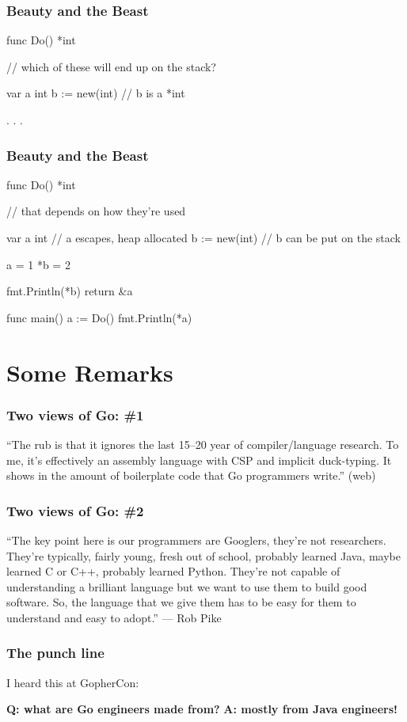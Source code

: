\documentclass[compress,t,11pt]{beamer}
\begin{document}
\begin{frame}[fragile]
    \frametitle{Beauty and the Beast}
\begin{golang}
func Do() *int {
    // which of these will end up on the stack?

    var a int
    b := new(int)   // b is a *int

    . . .
}
\end{golang}
\end{frame}

\begin{frame}[fragile]
    \frametitle{Beauty and the Beast}
\begin{golang}
func Do() *int {
    // that depends on how they're used

    var a int       // a escapes, heap allocated
    b := new(int)   // b can be put on the stack

    a = 1
    *b = 2

    fmt.Println(*b)
    return &a
}

func main() {
	a := Do()
	fmt.Println(*a)
}\end{golang}
\end{frame}

\section{Some Remarks}
\begin{frame}
    \frametitle{Two views of Go: \#1}
    { ``The rub is that it ignores the last 15--20 year
    of compiler/language research. To me, it's effectively an assembly language
    with CSP and implicit duck-typing. It shows in the amount of boilerplate
    code that Go programmers write.'' (web)\par}
\end{frame}

\begin{frame}
    \frametitle{Two views of Go: \#2}
    { ``The key point here is our programmers are Googlers,
    they’re not researchers. They’re typically, fairly young, fresh out of school,
    probably learned Java, maybe learned C or C++, probably learned Python.
    They’re not capable of understanding a brilliant language but we want to
    use them to build good software. So, the language that we give them has to
    be easy for them to understand and easy to adopt.'' --- Rob Pike \\}
\end{frame}

\begin{frame}
    \frametitle{The punch line}
    I heard this at GopherCon:
    \vspace{0.2\baselineskip}
    \begin{block}
        {{\bf\color{Cardinal}Q: what are Go engineers made from?}}
        {\bf A: mostly from Java engineers!}
    \end{block}
    \par
    \vspace{\baselineskip}
\end{frame}
\end{document}
